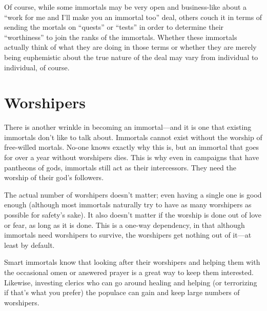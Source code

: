 \begin{multicols*}{2}
Of course, while some immortals may be very open and business-like about a “work for me and I’ll make you an immortal too” deal, others couch it in terms of sending the mortals on “quests” or “tests” in order to determine their “worthiness” to join the ranks of the immortals. Whether these immortals actually think of what they are doing in those terms or whether they are merely being euphemistic about the true nature of the deal may vary from individual to individual, of course. 


\section{Worshipers}
There is another wrinkle in becoming an immortal—and it is one that existing immortals don’t like to talk about. Immortals cannot exist without the worship of free-willed mortals. No-one knows exactly why this is, but an immortal that goes for over a year without worshipers dies. This is why even in campaigns that have pantheons of gods, immortals still act as their intercessors. They need the worship of their god’s followers.

The actual number of worshipers doesn’t matter; even having a single one is good enough (although most immortals naturally try to have as many worshipers as possible for safety’s sake). It also doesn’t matter if the worship is done out of love or fear, as long as it is done. This is a one-way dependency, in that although immortals need worshipers to survive, the worshipers get nothing out of it—at least by default.

Smart immortals know that looking after their worshipers and helping them with the occasional omen or answered prayer is a great way to keep them interested. Likewise, investing clerics who can go around healing and helping (or terrorizing if that’s what you prefer) the populace can gain and keep large numbers of worshipers.


\end{multicols*}
